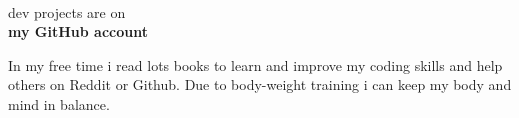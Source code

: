 \documentclass[10pt,A4]{article}
\begin{document}
\begin{minipage}{0.59\textwidth}
{		%
		\parbox[b][3cm][c]{3cm}{
			\\
			\textcolor{textcol}{dev projects are on}\\
			\textcolor{textcol}{\textbf{my GitHub account}}
		}

		\parbox[b][3cm][c]{4cm}{
			\textcolor{textcol}{In my free time i read lots books to learn and improve my coding skills and help others on Reddit or Github. Due to body-weight training i can keep my body and mind in balance.}
		}

}
\end{minipage}
\begin{minipage}{0.05\textwidth}
	\begin{center}
	\end{center}
\end{minipage}
\end{document}
